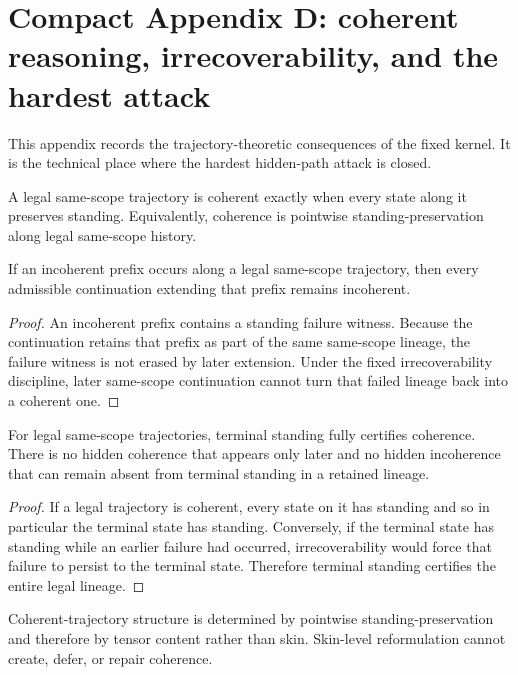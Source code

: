 \section{Compact Appendix D: coherent reasoning, irrecoverability, and the hardest attack}
\label{app:coherent}

This appendix records the trajectory-theoretic consequences of the fixed kernel. It is the technical place where the hardest hidden-path attack is closed.

\begin{definition}
A legal same-scope trajectory is coherent exactly when every state along it preserves standing. Equivalently, coherence is pointwise standing-preservation along legal same-scope history.
\end{definition}

\begin{theorem}
If an incoherent prefix occurs along a legal same-scope trajectory, then every admissible continuation extending that prefix remains incoherent.
\end{theorem}

\begin{proof}
An incoherent prefix contains a standing failure witness. Because the continuation retains that prefix as part of the same same-scope lineage, the failure witness is not erased by later extension. Under the fixed irrecoverability discipline, later same-scope continuation cannot turn that failed lineage back into a coherent one.
\end{proof}

\begin{theorem}
For legal same-scope trajectories, terminal standing fully certifies coherence. There is no hidden coherence that appears only later and no hidden incoherence that can remain absent from terminal standing in a retained lineage.
\end{theorem}

\begin{proof}
If a legal trajectory is coherent, every state on it has standing and so in particular the terminal state has standing. Conversely, if the terminal state has standing while an earlier failure had occurred, irrecoverability would force that failure to persist to the terminal state. Therefore terminal standing certifies the entire legal lineage.
\end{proof}

\begin{corollary}
Coherent-trajectory structure is determined by pointwise standing-preservation and therefore by tensor content rather than skin. Skin-level reformulation cannot create, defer, or repair coherence.
\end{corollary}


